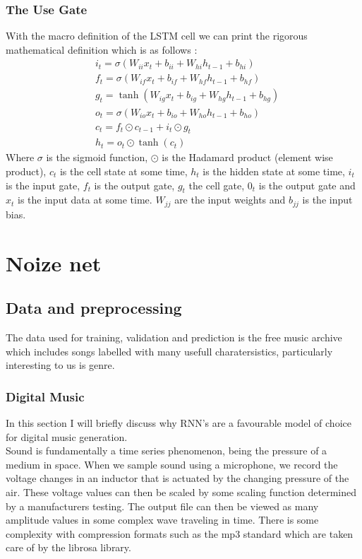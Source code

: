 \documentclass{article}
\begin{document}
\subsubsection{The Use Gate} 
With the macro definition of the LSTM cell we can print the rigorous mathematical definition which is as follows \cite{LSTM}:
\begin{align*}
&i_t = \sigma\left(W_{ii}x_t + b_{ii} + W_{hi}h_{t-1} + b_{hi} \right) \\
&f_t = \sigma\left(W_{if}x_t + b_{if} + W_{hf}h_{t-1} + b_{hf} \right) \\
&g_t = \tanh\left(W_{ig}x_t + b_{ig} + W_{hg}h_{t-1} + b_{hg} \right) \\
&o_t = \sigma\left(W_{io}x_t + b_{io} + W_{ho}h_{t-1} + b_{ho} \right) \\
&c_t = f_t \odot c_{t-1} + i_t \odot g_t \\
&h_t = o_t \odot \tanh(c_t)
\end{align*}
Where $\sigma$ is the sigmoid function, $\odot$ is the Hadamard product (element wise product), $c_t$ is the cell state at some time, $h_t$ is the hidden state at some time, $i_t$ is the input gate, $f_t$ is the output gate, $g_t$ the cell gate, $0_t$ is the output gate and $x_t$ is the input data at some time. $W_{jj}$ are the input weights and $b_{jj}$ is the input bias. 
\section{Noize net}
\label{sec:nn}
\subsection{Data and preprocessing}
The data used for training, validation and prediction is the free music archive which includes songs labelled with many usefull charatersistics, particularly interesting to us is genre.  \cite{fma_dataset}
\cite{fma_challenge}
\subsubsection{Digital Music}
In this section I will briefly discuss why RNN's are a favourable model of choice for digital music generation. \\
Sound is fundamentally a time series phenomenon, being the pressure of a medium in space. When we sample sound using a microphone, we record the voltage changes in an inductor that is actuated by the changing pressure of the air. These voltage values can then be scaled by some scaling function determined by a manufacturers testing. The output file can then be viewed as many amplitude values in some complex wave traveling in time. There is some complexity with compression formats such as the mp3 standard which are taken care of by the librosa library. \cite{isoMP3}
\end{document}

